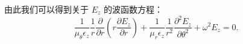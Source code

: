 由此我们可以得到关于 $E_z$ 的波函数方程：
\begin{equation}
  \frac{1}{\mu_\theta \epsilon_z} \frac{1}{r} \frac{\partial}{\partial r}
  \left(r \frac{\partial E_z}{\partial r} \right) + \frac{1}{\mu_r \epsilon_z}
  \frac{1}{r^2} \frac{\partial^2E_z}{\partial\theta^2} +\omega^2 E_z = 0.
\end{equation}
